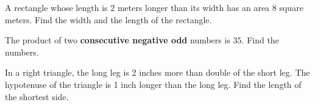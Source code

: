 \vfill
\begin{center} \hfill
\end{center}




\newpage


\begin{exercise}
	A rectangle whose length is $2$ meters longer than its width  has an area $8$ square meters. Find the width and the length of the rectangle.
\end{exercise}

\vfill
\begin{center}\hfill
\end{center}




\begin{exercise}
	The product of two \textbf{consecutive negative odd} numbers is $35$. Find the numbers.
\end{exercise}

\vfill
\begin{center}\hfill
\end{center}

\newpage


\begin{exercise}
	In a right triangle, the long leg is 2 inches more than double of the short leg. The hypotenuse of the triangle is 1 inch longer than the long leg. Find the length of the shortest side.
\end{exercise}

